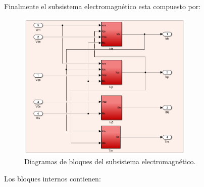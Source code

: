 \documentclass{article}
\begin{document}
Finalmente el subsistema electromagnético esta compuesto por:

\begin{figure}[H]
    \centering
    \includegraphics[width=0.75\textwidth]{sub_electromagentico.png}
    \caption{Diagramas de bloques del subsistema electromagnético.}
\end{figure}

Los bloques internos contienen:
\end{document}
